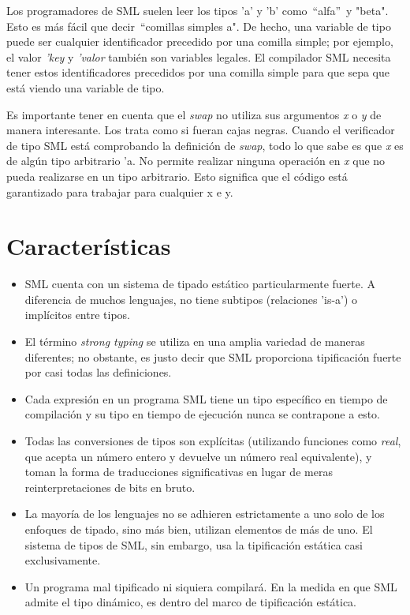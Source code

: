 \documentclass[10pt,journal,compsoc]{IEEEtran}
\begin{document}
Los programadores de SML suelen leer los tipos 'a' y 'b' como~\textquotedblleft alfa\textquotedblright~y "beta". Esto es m\'as f\'acil que decir~\textquotedblleft comillas simples a". De hecho, una variable de tipo puede ser cualquier identificador precedido por una comilla simple; por ejemplo, el valor \textit{'key} y \textit{'valor} tambi\'en son variables legales. El compilador SML necesita tener estos identificadores precedidos por una comilla simple para que sepa que est\'a viendo una variable de tipo.

Es importante tener en cuenta que el \textit{swap} no utiliza sus argumentos \textit{x} o \textit{y} de manera interesante. Los trata como si fueran cajas negras. Cuando el verificador de tipo SML est\'a comprobando la definici\'on de \textit{swap}, todo lo que sabe es que \textit{x} es de alg\'un tipo arbitrario 'a. No permite realizar ninguna operaci\'on en \textit{x} que no pueda realizarse en un tipo arbitrario. Esto significa que el c\'odigo est\'a garantizado para trabajar para cualquier x e y.

\section{Caracter\'isticas}
\begin{itemize}
\item SML cuenta con un sistema de tipado est\'atico particularmente fuerte. A diferencia de muchos lenguajes, no tiene subtipos (relaciones 'is-a') o impl\'icitos entre tipos.

\item El t\'ermino \textit{strong typing} se utiliza en una amplia variedad de maneras diferentes; no obstante, es justo decir que SML proporciona tipificaci\'on fuerte por casi todas las definiciones. 

\item Cada expresi\'on en un programa SML tiene un tipo espec\'ifico en tiempo de compilaci\'on y su tipo en tiempo de ejecuci\'on nunca se contrapone a esto.

\item Todas las conversiones de tipos son expl\'icitas (utilizando funciones como \textit{real}, que acepta un n\'umero entero y devuelve un n\'umero real equivalente), y toman la forma de traducciones significativas en lugar de meras reinterpretaciones de bits en bruto.

\item La mayor\'ia de los lenguajes no se adhieren estrictamente a uno solo de los enfoques de tipado, sino m\'as bien, utilizan elementos de m\'as de uno. El sistema de tipos de SML, sin embargo, usa la tipificaci\'on est\'atica casi exclusivamente. 

\item Un programa mal tipificado ni siquiera compilar\'a. En la medida en que SML admite el tipo din\'amico, es dentro del marco de tipificaci\'on est\'atica.
\end{itemize}
\end{document}
